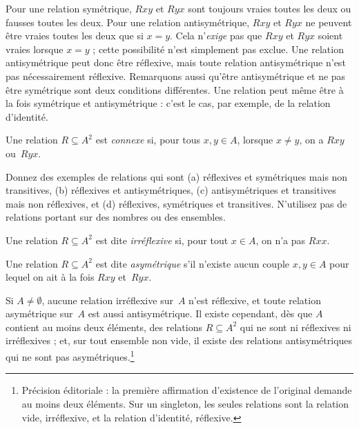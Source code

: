 \documentclass[11pt,a4paper,openany]{memoir}
\begin{document}
\begin{explain}
Pour une relation symétrique, $Rxy$ et $Ryx$ sont toujours vraies toutes
les deux ou fausses toutes les deux. Pour une relation antisymétrique,
$Rxy$ et $Ryx$ ne peuvent être vraies toutes les deux que si $x = y$.
Cela n’\emph{exige} pas que $Rxy$ et $Ryx$ soient vraies lorsque $x = y$ ;
cette possibilité n’est simplement pas exclue. Une relation antisymétrique
peut donc être réflexive, mais toute relation antisymétrique n’est pas
nécessairement réflexive. Remarquons aussi qu’être antisymétrique et ne pas
être symétrique sont deux conditions différentes. Une relation peut même
être à la fois symétrique et antisymétrique : c’est le cas, par exemple,
de la relation d’identité.
\end{explain}

\begin{defn}[Connexité]
Une relation $R \subseteq A^2$ est \emph{connexe} si, pour tous $x,y\in A$,
lorsque $x \neq y$, on a $Rxy$ ou~$Ryx$.
\end{defn}

\begin{prob}
Donnez des exemples de relations qui sont (a) réflexives et symétriques
mais non transitives, (b) réflexives et antisymétriques,
(c) antisymétriques et transitives mais non réflexives, et
(d) réflexives, symétriques et transitives. N’utilisez pas de relations
portant sur des nombres ou des ensembles.
\end{prob}

\begin{defn}[Irréflexivité]
Une relation $R \subseteq A^2$ est dite \emph{irréflexive} si,
pour tout $x \in A$, on n’a pas $Rxx$.
\end{defn}

\begin{defn}[Asymétrie]
Une relation $R \subseteq A^2$ est dite \emph{asymétrique} s’il n’existe
aucun couple $x,y\in A$ pour lequel on ait à la fois $Rxy$ et~$Ryx$.
\end{defn}

Si $A \neq \emptyset$, aucune relation irréflexive sur~$A$ n’est réflexive,
et toute relation asymétrique sur~$A$ est aussi antisymétrique.
Il existe cependant, dès que $A$ contient au moins deux éléments,
des relations $R \subseteq A^2$ qui ne sont ni réflexives ni
irréflexives ; et, sur tout ensemble non vide, il existe des relations
antisymétriques qui ne sont pas asymétriques.\footnote{Précision éditoriale :
la première affirmation d’existence de l’original demande au moins deux
éléments. Sur un singleton, les seules relations sont la relation vide,
irréflexive, et la relation d’identité, réflexive.}
\end{document}
